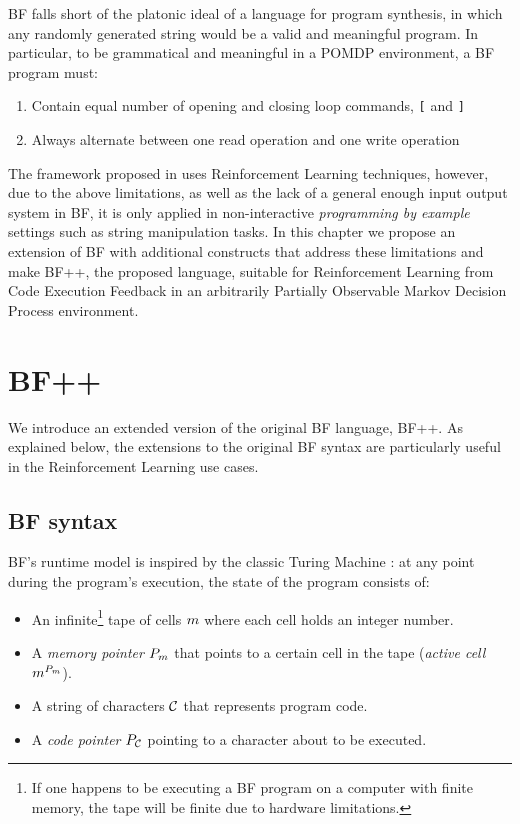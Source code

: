 BF falls short of the platonic ideal of a language for program synthesis, in which any randomly generated string would be a valid and meaningful program.
In particular, to be grammatical and meaningful in a POMDP environment, a BF program must:
\begin{enumerate}
    \item Contain equal number of opening and closing loop commands, \texttt{[} and \texttt{]}
    \item Always alternate between one read operation and one write operation
\end{enumerate}

The framework proposed in \cite{abolafiaNeuralProgramSynthesis2018} uses Reinforcement Learning techniques, however, due to the above limitations, as well as the lack of a general enough input output system in BF, it is only applied in non-interactive \emph{programming by example} settings such as string manipulation tasks.
In this chapter we propose an extension of BF with additional constructs that address these limitations and make BF++, the proposed language, suitable for Reinforcement Learning from Code Execution Feedback in an arbitrarily Partially Observable Markov Decision Process environment.

\newpage
\section{BF++}

We introduce an extended version of the original BF language, BF++. 
As explained below, the extensions to the original BF syntax are particularly useful in the Reinforcement Learning use cases. 

\subsection{BF syntax}
\label{sec:bf}

BF's runtime model is inspired by the classic Turing Machine \cite{turingComputableNumbersApplication1938}: at any point during the program's execution, the state of the program consists of:

\begin{itemize}
    \item An infinite\footnote{If one happens to be executing a BF program on a computer with finite memory, the tape will be finite due to hardware limitations.} tape of cells $m$ where each cell holds an integer number.
    \item A \textit{memory pointer} $P_m$ that points to a certain cell in the tape (\textit{active cell} $m^{P_m}$).
    \item A string of characters $\mathcal{C}$ that represents program code.
    \item A \textit{code pointer} $P_{\mathcal{C}}$ pointing to a character about to be executed.
\end{itemize}

